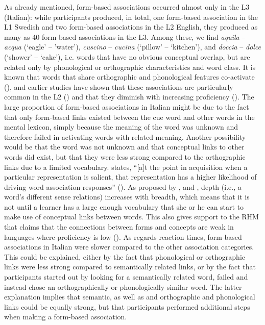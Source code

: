 \documentclass[output=paper,colorlinks,citecolor=brown,nonflat]{langsci/langscibook}
\begin{document}
As already mentioned, form-based associations occurred almost only in the L3 (Italian): while participants produced, in total, one form-based association in the L1 Swedish and two form-based associations in the L2 English, they produced as many as 40 form-based associations in the L3. Among these, we find \textit{aquila} – \textit{acqua} (‘eagle’ -- ’water’), \textit{cuscino} – \textit{cucina} (‘pillow’ – ‘kitchen’), and \textit{doccia} – \textit{dolce} (‘shower’ – ‘cake’), i.e. words that have no obvious conceptual overlap, but are related only by phonological or orthographic characteristics and word class. It is known that words that share orthographic and phonological features co-activate (\citealt{VanHeuvenEtAl1998, Aitchison2012}), and earlier studies have shown that these associations are particularly common in the L2 (\citealt{Meara1978, FitzpatrickIzura2011}) and that they diminish with increasing proficiency (\citealt{RiegelZivian1972}). The large proportion of form-based associations in Italian might be due to the fact that only form-based links existed between the cue word and other words in the mental lexicon, simply because the meaning of the word was unknown and therefore failed in activating words with related meaning. Another possibility would be that the word was not unknown and that conceptual links to other words did exist, but that they were less strong compared to the orthographic links due to a limited vocabulary. \citeauthor{EllisN1996} states, “[a]t the point in acquisition when a particular representation is salient, that representation has a higher likelihood of driving word association responses” (\citeyear[93]{EllisN1996}). As proposed by \citet{Nation2001}, and \citet{HaastrupHenriksen2000}, depth (i.e., a word’s different sense relations) increases with breadth, which means that it is not until a learner has a large enough vocabulary that she or he can start to make use of conceptual links between words. This also gives support to the RHM that claims that the connections between forms and concepts are weak in languages where proficiency is low (\citealt{KrollStewart1994}). As regards reaction times, form-based associations in Italian were slower compared to the other association categories. This could be explained, either by the fact that phonological or orthographic links were less strong compared to semantically related links, or by the fact that participants started out by looking for a semantically related word, failed and instead chose an orthographically or phonologically similar word. The latter explanation implies that semantic, as well as and orthographic and phonological links could be equally strong, but that participants performed additional steps when making a form-based association.
\end{document}
